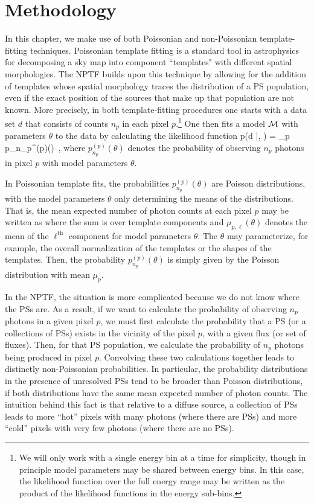 \section{Methodology} 
\label{sec:methodology}

In this chapter, we make use of both Poissonian and non-Poissonian template-fitting techniques.  
Poissonian template fitting is a standard tool in astrophysics for decomposing a sky map into component ``templates" with different spatial morphologies.  The NPTF builds upon this technique by allowing for the addition of templates whose spatial morphology traces the distribution of a PS population, even if the exact position of the sources that make up that population are not known.  More precisely, in both template-fitting procedures one starts with a data set $d$ that consists of counts $n_p$ in each pixel $p$.\footnote{We will only work with a single energy bin at a time for simplicity, though in principle model parameters may be shared between energy bins.  In this case, the likelihood function over the full energy range may be written as the product of the likelihood functions in the energy sub-bins.}  One then fits a model ${\cal M}$ with parameters $\theta$ to the data by calculating the likelihood function 
\be
p(d |\theta, ) = \prod_p p_{n_p}^{(p)}(\theta) \,,
\label{eq:likelihood}
\ee
where $p_{n_p}^{(p)}(\theta)$ denotes the probability of observing $n_p$ photons in pixel $p$ with model parameters $\theta$.

In Poissonian template fits, the probabilities $p_{n_p}^{(p)}(\theta)$ are Poisson distributions, with the model parameters $\theta$ only determining the means of the distributions.  That is, the mean expected number of photon counts at each pixel $p$ may be written as 
where the sum is over template components and $\mu_{p, \ell} (\theta)$ denotes the mean of the $\ell^\text{th}$ component for model parameters $\theta$.  The $\theta$ may parameterize, for example, the overall normalization of the templates or the shapes of the templates.  Then, the probability $p_{n_p}^{(p)}(\theta)$ is simply given by the Poisson distribution with mean $\mu_p$.  

In the NPTF, the situation is more complicated because we do not know where the PSs are.  As a result, if we want to calculate the probability of observing $n_p$ photons in a given pixel $p$, we must first calculate the probability that a PS (or a collections of PSs) exists in the vicinity of the pixel $p$, with a given flux (or set of fluxes).  Then, for that PS population, we calculate the probability of $n_p$ photons being produced in pixel $p$.  Convolving these two calculations together leads to distinctly non-Poissonian probabilities.  In particular, the probability distributions in the presence of unresolved PSs tend to be broader than Poisson distributions, if both distributions have the same mean expected number of photon counts.  The intuition behind this fact is that relative to a diffuse source, a collection of PSs leads to more ``hot'' pixels with many photons (where there are PSs) and more ``cold'' pixels with very few photons (where there are no PSs).  

